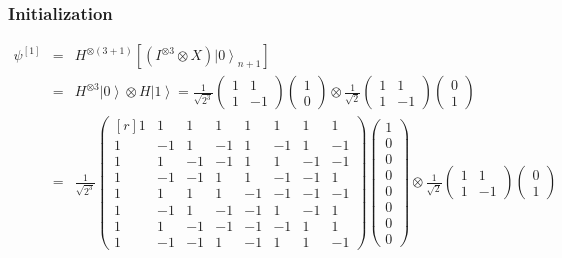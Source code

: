 \begin{frame}
\frametitle{Initialization}
\begin{exampleblock}{}
\begin{eqnarray}
\psi^{[1]}&=&H^{\otimes\left(3+1\right)}\left[(I^{\otimes3}\otimes X)\left.|0\right\rangle _{n+1}\right]\nonumber\\
&=&H^{\otimes3}\left.|0\right\rangle \otimes H\left.|1\right\rangle= \frac{1}{\sqrt{2^{3}}}\left(\begin{array}{cc}
1 & 1\\
1 & -1
\end{array}\right)\left(\begin{array}{c}
1\\
0
\end{array}\right)\otimes\frac{1}{\sqrt{2}}\left(\begin{array}{cc}
1 & 1\\
1 & -1
\end{array}\right)\left(\begin{array}{c}
0\\
1
\end{array}\right)\nonumber\\
&=&\frac{1}{\sqrt{2^{3}}}\begin{pmatrix*}[r]
1 & 1 & 1 & 1 & 1 & 1 & 1 & 1\\
1 & -1 & 1 & -1 & 1 & -1 & 1 & -1\\
1 & 1 & -1 & -1 & 1 & 1 & -1 & -1\\
1 & -1 & -1 & 1 & 1 & -1 & -1 & 1\\
1 & 1 & 1 & 1 & -1 & -1 & -1 & -1\\
1 & -1 & 1 & -1 & -1 & 1 & -1 & 1\\
1 & 1 & -1 & -1 & -1 & -1 & 1 & 1\\
1 & -1 & -1 & 1 & -1 & 1 & 1 & -1
\end{pmatrix*}\left(\begin{array}{c}
1\\
0\\
0\\
0\\
0\\
0\\
0\\
0
\end{array}\right)\otimes\frac{1}{\sqrt{2}}\left(\begin{array}{cc}
1 & 1\\
1 & -1
\end{array}\right)\left(\begin{array}{c}
0\\
1
\end{array}\right)\nonumber
\end{eqnarray}
\end{exampleblock}
\end{frame}

